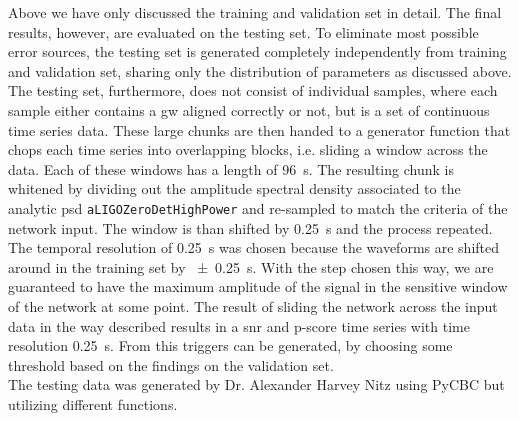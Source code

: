 Above we have only discussed the training and validation set in detail. The final results, however, are evaluated on the testing set. To eliminate most possible error sources, the testing set is generated completely independently from training and validation set, sharing only the distribution of parameters as discussed above. The testing set, furthermore, does not consist of individual samples, where each sample either contains a \gls{gw} aligned correctly or not, but is a set of continuous time series data. These large chunks are then handed to a generator function that chops each time series into overlapping blocks, i.e. sliding a window across the data. Each of these windows has a length of \SI{96}{\s}. The resulting chunk is whitened by dividing out the amplitude spectral density associated to the analytic \gls{psd} \verb|aLIGOZeroDetHighPower| and re-sampled to match the criteria of the network input. The window is than shifted by \SI{0.25}{\s} and the process repeated. The temporal resolution of \SI{0.25}{\s} was chosen because the waveforms are shifted around in the training set by \SI{\pm 0.25}{\s}. With the step chosen this way, we are guaranteed to have the maximum amplitude of the signal in the sensitive window of the network at some point. The result of sliding the network across the input data in the way described results in a \gls{snr} and p-score time series with time resolution \SI{0.25}{\s}. From this triggers can be generated, by choosing some threshold based on the findings on the validation set.\\
The testing data was generated by Dr. Alexander Harvey Nitz using PyCBC but utilizing different functions.

